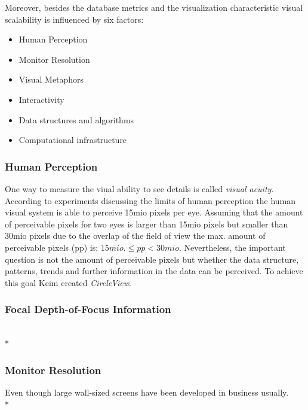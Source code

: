 



Moreover, besides the database metrics and the visualization characteristic visual scalability is influenced by six factors: 
\begin{itemize}
    \item Human Perception\cite{Keim2005,Deering1998}
    \item Monitor Resolution 
    \item Visual Metaphors
    \item Interactivity
    \item Data structures and algorithms
    \item Computational infrastructure
\end{itemize}

\subsubsection*{Human Perception} 
One way to measure the viual ability to see details is called \textit{visual acuity}\cite{Ware2012a}. 
According to experiments discussing the limits of human perception \cite{Deering1998} the human visual system is able to perceive 15mio pixels per eye. Assuming that the amount of perceivable pixels for two eyes is larger than 15mio pixels but smaller than 30mio pixels due to the overlap of the field of view the max. amount of perceivable pixels (pp) is:
\begin{math}
15 mio. \leq pp < 30 mio.
\end{math}
Nevertheless, the important question is not the amount of perceivable pixels but whether the data structure, patterns, trends and further information in the data can be perceived. To achieve this goal Keim\cite{Keim2005} created \textit{CircleView}.
\subsubsection*{Focal Depth-of-Focus Information}
\\*
\subsubsection*{Monitor Resolution}
Even though large wall-sized screens have been developed in business usually. 
\\*
